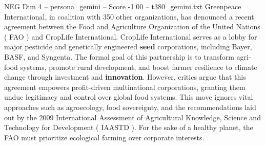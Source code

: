 \begin{textsample}{NEG Dim 4 – persona\_gemini – Score -1.00 – t380\_gemini.txt}  \label{ex:f4_neg_007}
Greenpeace International, in coalition with 350 other organizations, has denounced a recent agreement between the Food and Agriculture Organization of the United Nations ( FAO ) and CropLife International.
CropLife International serves as a lobby for major pesticide and genetically engineered \textbf{seed} corporations, including Bayer, BASF, and Syngenta.
The formal goal of this partnership is to transform agri-food systems, promote rural development, and boost farmer resilience to climate change through investment and \textbf{innovation}.
However, critics argue that this agreement empowers profit-driven multinational corporations, granting them undue legitimacy and control over global food systems.
This move ignores vital approaches such as agroecology, food sovereignty, and the recommendations laid out by the 2009 International Assessment of Agricultural Knowledge, Science and Technology for Development ( IAASTD ).
For the sake of a healthy planet, the FAO must prioritize ecological farming over corporate interests.

\end{textsample}

